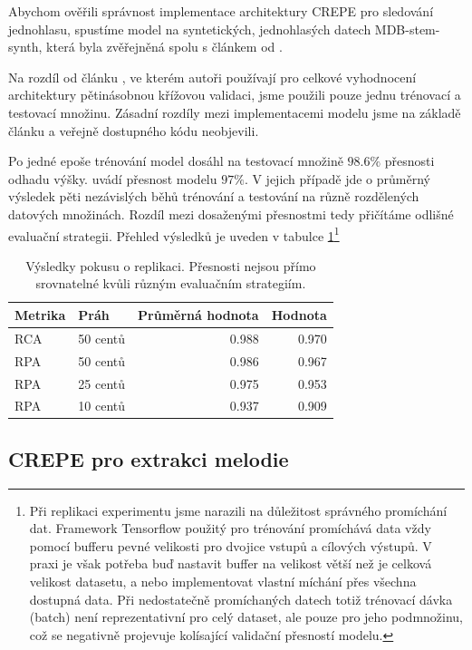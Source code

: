 Abychom ověřili správnost implementace architektury CREPE pro sledování jednohlasu, spustíme model na syntetických, jednohlasých datech MDB-stem-synth, která byla zvěřejněná spolu s článkem od \cite{Salamon2017}.

Na rozdíl od článku \cite{Kim2018}, ve kterém autoři používají pro celkové vyhodnocení architektury pětinásobnou křížovou validaci, jsme použili pouze jednu trénovací a testovací množinu. Zásadní rozdíly mezi implementacemi modelu jsme na základě článku a veřejně dostupného kódu neobjevili.

Po jedné epoše trénování model dosáhl na testovací množině $98.6\%$ přesnosti odhadu výšky. \cite{Kim2018} uvádí přesnost modelu $97\%$. V jejich případě jde o průměrný výsledek pěti nezávislých běhů trénování a testování na různě rozdělených datových množinách. Rozdíl mezi dosaženými přesnostmi tedy přičítáme odlišné evaluační strategii. Přehled výsledků je uveden v tabulce \ref{tab:crepe_replicate}\footnote{Při replikaci experimentu jsme narazili na důležitost správného promíchání dat. Framework Tensorflow použitý pro trénování promíchává data vždy pomocí bufferu pevné velikosti pro dvojice vstupů a cílových výstupů. V praxi je však potřeba buď nastavit buffer na velikost větší než je celková velikost datasetu, a nebo implementovat vlastní míchání přes všechna dostupná data. Při nedostatečně promíchaných datech totiž trénovací dávka (batch) není reprezentativní pro celý dataset, ale pouze pro jeho podmnožinu, což se negativně projevuje kolísající validační přesností modelu.
}

\begin{table}[h!]

\centering
    \begin{tabular}{llrr}
    \toprule
    Metrika & Práh & Průměrná hodnota & Hodnota \cite{Kim2018} \\
    \midrule
    RCA & 50 centů & 0.988 & 0.970 \\
    RPA  & 50 centů & 0.986 & 0.967 \\
    RPA  & 25 centů & 0.975 & 0.953 \\
    RPA  & 10 centů & 0.937 & 0.909 \\
    \bottomrule
    \end{tabular}
\caption{Výsledky pokusu o replikaci. Přesnosti nejsou přímo srovnatelné kvůli různým evaluačním strategiím.}\label{tab:crepe_replicate}

\end{table}

\subsection{CREPE pro extrakci melodie}

